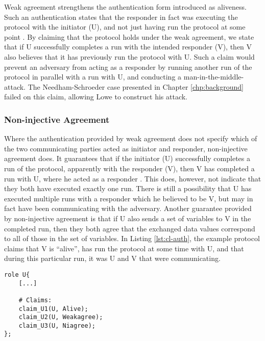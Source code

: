 Weak agreement strengthens the authentication form introduced as aliveness. Such an authentication states that the responder in fact was executing the protocol with the initiator (U), and not just having run the protocol at some point \cite{lowe1997hierarchy}. By claiming that the protocol holds under the weak agreement, we state that if U successfully completes a run with the intended responder (V), then V also believes that it has previously run the protocol with U. Such a claim would prevent an adversary from acting as a responder by running another run of the protocol in parallel with a run with U, and conducting a man-in-the-middle-attack. The Needham-Schroeder case presented in Chapter \ref{chp:background} failed on this claim, allowing Lowe to construct his attack. 


\subsubsection{Non-injective Agreement}

Where the authentication provided by weak agreement does not specify which of the two communicating parties acted as initiator and responder, non-injective agreement does. It guarantees that if the initiator (U) successfully completes a run of the protocol, apparently with the responder (V), then V has completed a run with U, where he acted as a responder \cite{lowe1997hierarchy}. This does, however, not indicate that they both have executed exactly one run. There is still a possibility that U has executed multiple runs with a responder which he believed to be V, but may in fact have been communicating with the adversary. Another guarantee provided by non-injective agreement is that if U also sends a set of variables to V in the completed run, then they both agree that the exchanged data values correspond to all of those in the set of variables. In Listing \ref{lst:cl-auth}, the example protocol claims that V is ``alive'', has run the protocol at some time with U, and that during this particular run, it was U and V that were communicating.\newline

\begin{lstlisting}[caption={Example of how to claim authentication by use of alive, weak-agreement, and non-injective agreement.}, label={lst:cl-auth}]
role U{
	[...]
	
	# Claims:
	claim_U1(U, Alive);
	claim_U2(U, Weakagree);
	claim_U3(U, Niagree);
};
\end{lstlisting} 


